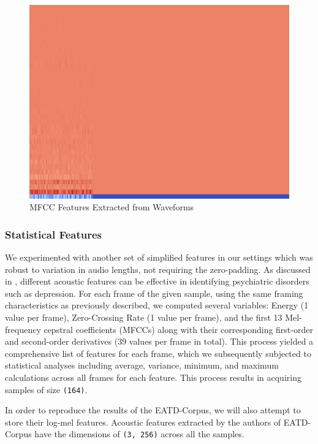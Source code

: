 \begin{figure}[!t]
    \centerline{\includegraphics[width=\columnwidth]{images/mfcc.png}}
    \caption{MFCC Features Extracted from Waveforms}
    \label{fig:mfcc}
\end{figure}

\subsubsection{Statistical Features}

We experimented with another set of simplified features in our settings which was robust to variation in audio lengths, not requiring the zero-padding. As discussed in \cite{low2020automated}, different acoustic features can be effective in identifying psychiatric disorders such as depression. For each frame of the given sample, using the same framing characteristics as previously described, we computed several variables: Energy (1 value per frame), Zero-Crossing Rate (1 value per frame), and the first 13 Mel-frequency cepstral coefficients (MFCCs) along with their corresponding first-order and second-order derivatives (39 values per frame in total). This process yielded a comprehensive list of features for each frame, which we subsequently subjected to statistical analyses including average, variance, minimum, and maximum calculations across all frames for each feature. This process results in acquiring samples of size \texttt{(164)}.

In order to reproduce the results of the EATD-Corpus, we will also attempt to store their log-mel features. Acoustic features extracted by the authors of EATD-Corpus have the dimensions of \texttt{(3, 256)} across all the samples.


